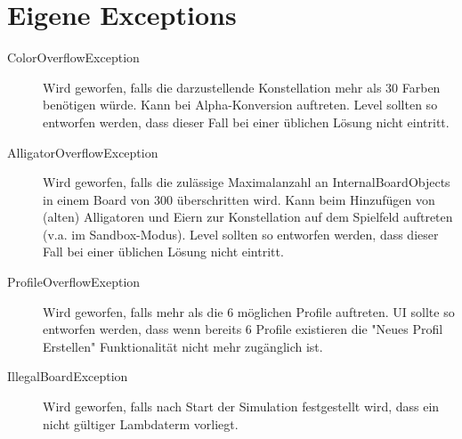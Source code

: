 \chapter{Eigene Exceptions}
\begin{description}
\item[ColorOverflowException] Wird geworfen, falls die darzustellende Konstellation mehr als 30 Farben benötigen würde.  Kann bei Alpha-Konversion auftreten. Level sollten so entworfen werden, dass dieser Fall bei einer üblichen Lösung nicht eintritt.
\item[AlligatorOverflowException] Wird geworfen, falls die zulässige Maximalanzahl an InternalBoardObjects in einem Board von 300 überschritten wird. Kann beim Hinzufügen von (alten) Alligatoren und Eiern zur Konstellation auf dem Spielfeld auftreten (v.a. im Sandbox-Modus).  Level sollten so entworfen werden, dass dieser Fall bei einer üblichen Lösung nicht eintritt.
\item[ProfileOverflowExeption] Wird geworfen, falls mehr als die 6 möglichen Profile auftreten. UI sollte so entworfen werden, dass wenn bereits 6 Profile existieren die "Neues Profil Erstellen" Funktionalität nicht mehr zugänglich ist.
\item[IllegalBoardException] Wird geworfen, falls nach Start der Simulation festgestellt wird, dass ein nicht gültiger Lambdaterm vorliegt.
\end{description}

